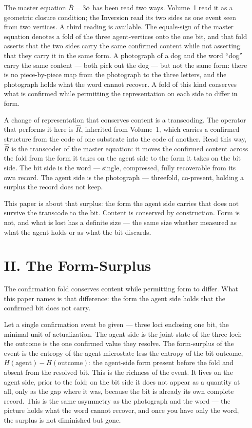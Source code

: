 \documentclass[11pt,oneside]{report}
\theoremstyle{definition}
\theoremstyle{remark}
\begin{document}
The master equation \ensuremath{\bar{B} = 3\bar{\alpha}} has been read two ways. Volume~1 read
it as a geometric closure condition; the Inversion read its two sides as one event seen from
two vertices. A third reading is available. The equals-sign of the master equation denotes a fold of the
three agent-vertices onto the one bit, and that fold asserts that the two sides carry the same
confirmed content while not asserting that they carry it in the same form. A
photograph of a dog and the word ``dog'' carry the same content --- both pick out the dog ---
but not the same form: there is no piece-by-piece map from the photograph to the three letters,
and the photograph holds what the word cannot recover. A fold of this kind conserves
what is confirmed while permitting the representation on each side to differ in form.

A change of representation that conserves content is a transcoding. The operator that performs
it here is \ensuremath{\hat{R}}, inherited from Volume~1, which carries a confirmed structure
from the code of one substrate into the code of another. Read this way, \ensuremath{\hat{R}} is
the transcoder of the master equation: it moves the confirmed content across the fold
from the form it takes on the agent side to the form it takes on the bit side. The bit side is
the word --- single, compressed, fully recoverable from its own record. The agent side is the
photograph --- threefold, co-present, holding a surplus the record does not keep.

This paper is about that surplus: the form the agent side carries that does not survive the
transcode to the bit. Content is conserved by construction. Form is not, and what is lost has a
definite size --- the same size whether measured as what the agent holds or as what the bit
discards.

\section*{II. The Form-Surplus}

The confirmation fold conserves content while permitting form to differ. What this paper names
is that difference: the form the agent side holds that the confirmed bit does not carry.

Let a single confirmation event be given --- three loci enclosing one bit, the minimal unit of
actualization. The agent side is the joint state of the three loci; the outcome is the one
confirmed value they resolve. The form-surplus of the event is the entropy of the agent
microstate less the entropy of the bit outcome, \ensuremath{H(\text{agent}) - H(\text{outcome})}:
the agent-side form present before the fold and absent from the resolved bit. This is the
richness of the event. It lives on the agent side, prior to the fold; on the bit side it does
not appear as a quantity at all, only as the gap where it was, because the bit is already its
own complete record. This is the same asymmetry as the photograph and the word --- the picture
holds what the word cannot recover, and once you have only the word, the surplus is not
diminished but gone.
\end{document}
